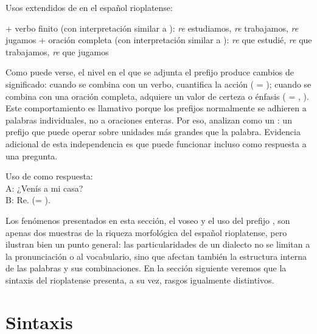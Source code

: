 \begin{exe}
  \ex\label{ex:15-reext} Usos extendidos de  en el español
      rioplatense:
    \begin{xlist}
      \ex {} + verbo finito (con interpretación similar a
          ): \textit{re} estudiamos, \textit{re} trabajamos,
          \textit{re} jugamos
      \ex {} + oración completa (con interpretación similar a
          ): \textit{re} que estudié, \textit{re} que
          trabajamos, \textit{re} que jugamos
    \end{xlist}
\end{exe}

Como puede verse, el nivel en el que se adjunta el prefijo produce cambios de
significado: cuando se combina con un verbo, cuantifica la acción ( = ); cuando se combina con una oración
completa, adquiere un valor de certeza o énfasis ( =
, ). Este comportamiento es
llamativo porque los prefijos normalmente se adhieren a palabras individuales,
no a oraciones enteras. Por eso, \textcite{kornfeld2013} analizan 
como un : un prefijo que puede operar sobre unidades más
grandes que la palabra. Evidencia adicional de esta independencia es que
 puede funcionar incluso como respuesta a una pregunta.

\begin{exe}
  \ex\label{ex:15-rerespuesta} Uso de  como respuesta:\\
      A: ¿Venís a mi casa?\\
      B: Re. (= ).
\end{exe}

Los fenómenos presentados en esta sección, el voseo y el uso del prefijo
, son apenas dos muestras de la riqueza morfológica del español
rioplatense, pero ilustran bien un punto general: las particularidades de un
dialecto no se limitan a la pronunciación o al vocabulario, sino que afectan
también la estructura interna de las palabras y sus combinaciones. En la sección
siguiente veremos que la sintaxis del rioplatense presenta, a su vez, rasgos
igualmente distintivos.

\section{Sintaxis}\label{sec:15-sintaxis}

